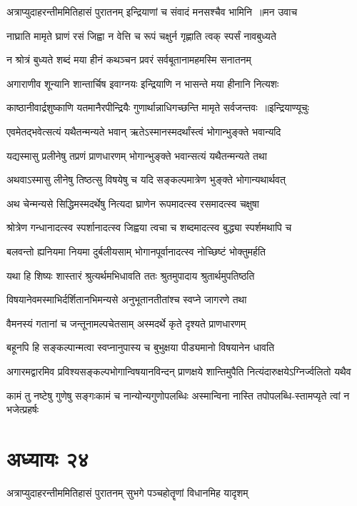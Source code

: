 \threelineshloka
{अत्राप्युदाहरन्तीममितिहासं पुरातनम्}
{इन्द्रियाणां च संवादं मनसश्चैव भामिनि ॥मन उवाच}
{}


\twolineshloka
{नाघ्राति मामृते घ्राणं रसं जिह्वा न वेत्ति च}
{रूपं चक्षुर्न गृह्णाति त्वक् स्पर्सं नावबुध्यते}


\twolineshloka
{न श्रोत्रं बुध्यते शब्दं मया हीनं कथञ्चन}
{प्रवरं सर्वबूतानामहमस्मि सनातनम्}


\twolineshloka
{अगाराणीव शून्यानि शान्तार्चिष इवाग्नयः}
{इन्द्रियाणि न भासन्ते मया हीनानि नित्यशः}


\threelineshloka
{काष्ठानीवार्द्रशुष्काणि यतमानैरपीन्द्रियैः}
{गुणार्थान्नाधिगच्छन्ति मामृते सर्वजन्तवः ॥इन्द्रियाण्यूचुः}
{}


\twolineshloka
{एवमेतद्भवेत्सत्यं यथैतन्मन्यते भवान्}
{ऋतेऽस्मानस्मदर्थांस्त्वं भोगान्भुङ्क्ते भवान्यदि}


\twolineshloka
{यद्यस्मासु प्रलीनेषु तप्रणं प्राणधारणम्}
{भोगान्भुङ्क्ते भवान्सत्यं यथैतन्मन्यते तथा}


\twolineshloka
{अथवाऽस्मासु लीनेषु तिष्ठत्सु विषयेषु च}
{यदि सङ्कल्पमात्रेण भुङ्क्ते भोगान्यथार्थवत्}


\twolineshloka
{अथ चेन्मन्यसे सिद्धिमस्मदर्थेषु नित्यदा}
{घ्राणेन रूपमादत्स्व रसमादत्स्व चक्षुषा}


\twolineshloka
{श्रोत्रेण गन्धानादत्स्व स्पर्शानादत्स्व जिह्वया}
{त्वचा च शब्दमादत्स्व बुद्ध्या स्पर्शमथापि च}


\twolineshloka
{बलवन्तो ह्यनियमा नियमा दुर्बलीयसाम्}
{भोगानपूर्वानादत्स्व नोच्छिष्टं भोक्तुमर्हति}


\twolineshloka
{यथा हि शिष्यः शास्तारं श्रुत्यर्थमभिधावति}
{ततः श्रुतमुपादाय श्रुतार्थमुपतिष्ठति}


\twolineshloka
{विषयानेवमस्माभिर्दर्शितानभिमन्यसे}
{अनुभूतानतीतांश्च स्वप्ने जागरणे तथा}


\twolineshloka
{वैमनस्यं गतानां च जन्तूनामल्पचेतसाम्}
{अस्मदर्थे कृते दृश्यते प्राणधारणम्}


\twolineshloka
{बहूनपि हि सङ्कल्पान्मत्वा स्वप्नानुपास्य च}
{बुभुक्षया पीड्यमानो विषयानेन धावति}


\twolineshloka
{अगारमद्वारमिव प्रविश्यसङ्कल्पभोगान्विषयानविन्दन्}
{प्राणक्षये शान्तिमुपैति नित्यंदारुक्षयेऽग्निर्ज्वलितो यथैव}


\twolineshloka
{कामं तु नष्टेषु गुणेषु सङ्गःकामं च नान्योन्यगुणोपलब्धिः}
{अस्मान्विना नास्ति तपोपलब्धि-स्तामप्यृते त्वां न भजेत्प्रहर्षः}


\chapter{अध्यायः २४}
\twolineshloka
{अत्राप्युदाहरन्तीममितिहासं पुरातनम्}
{सुभगे पञ्चहोतॄणां विधानमिह यादृशम्}


